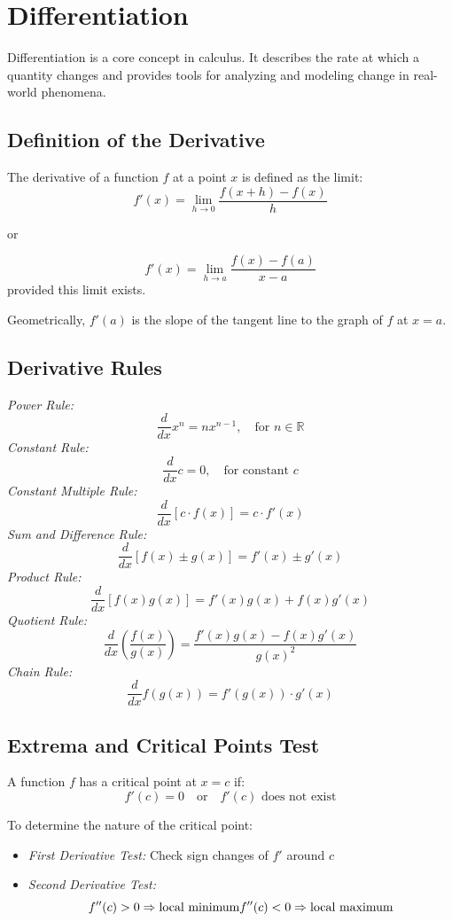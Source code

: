 \newpage
\section{Differentiation}

Differentiation is a core concept in calculus. It describes the rate at which a quantity changes and provides tools for analyzing and modeling change in real-world phenomena.

\subsection{Definition of the Derivative}

The derivative of a function \(f\) at a point \(x\) is defined as the limit:
\[
f'(x) = \lim_{h \to 0} \frac{f(x + h) - f(x)}{h}
\]

or

\[f'(x) = \lim_{h \to a}\frac{f(x) - f(a)}{x - a}\]
provided this limit exists.

Geometrically, \(f'(a)\) is the slope of the tangent line to the graph of \(f\) at \(x = a\).

\subsection{Derivative Rules}

\emph{Power Rule:}
\[
\frac{d}{dx} x^n = nx^{n - 1}, \quad \text{for } n \in \mathbb{R}
\]
\emph{Constant Rule:}
\[
\frac{d}{dx} c = 0, \quad \text{for constant } c
\]
\emph{Constant Multiple Rule:}
\[
\frac{d}{dx} [c \cdot f(x)] = c \cdot f'(x)
\]
\emph{Sum and Difference Rule:}
\[
\frac{d}{dx} [f(x) \pm g(x)] = f'(x) \pm g'(x)
\]
\emph{Product Rule:}
\[
\frac{d}{dx} [f(x)g(x)] = f'(x)g(x) + f(x)g'(x)
\]
\emph{Quotient Rule:}
\[
\frac{d}{dx} \left( \frac{f(x)}{g(x)} \right) = \frac{f'(x)g(x) - f(x)g'(x)}{{g(x)}^2}
\]
\emph{Chain Rule:}
\[
\frac{d}{dx} f(g(x)) = f'(g(x)) \cdot g'(x)
\]

\subsection{Extrema and Critical Points Test}

A function \(f\) has a critical point at \(x = c\) if:
\[
f'(c) = 0 \quad \text{or} \quad f'(c) \text{ does not exist}
\]

To determine the nature of the critical point:
\begin{itemize}[label=\(-\)]
\item \emph{First Derivative Test:} Check sign changes of \(f'\) around \(c\)
\item \emph{Second Derivative Test:}
\[
f''(c) > 0 \Rightarrow \text{local minimum} \\
f''(c) < 0 \Rightarrow \text{local maximum}
\]
\end{itemize}


